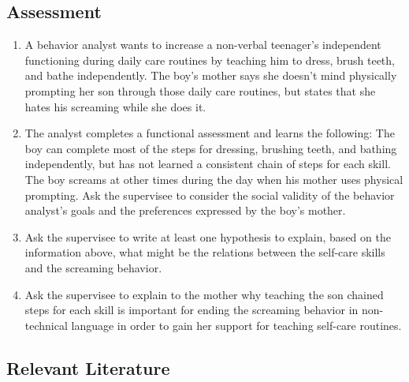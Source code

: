 \subsection{Assessment}
\begin{enumerate}
\item A behavior analyst wants to increase a non-verbal teenager's independent functioning during daily care routines by teaching him to dress, brush teeth, and bathe independently. The boy's mother says she doesn't mind physically prompting her son through those daily care routines, but states that she hates his screaming while she does it.

\item The analyst completes a functional assessment and learns the following: The boy can complete most of the steps for dressing, brushing teeth, and bathing independently, but has not learned a consistent chain of steps for each skill. The boy screams at other times during the day when his mother uses physical prompting. Ask the supervisee to consider the social validity of the behavior analyst's goals and the preferences expressed by the boy's mother. 

\item Ask the supervisee to write at least one hypothesis to explain, based on the information above, what might be the relations between the self-care skills and the screaming behavior.

\item Ask the supervisee to explain to the mother why teaching the son chained steps for each skill is important for ending the screaming behavior in non-technical language in order to gain her support for teaching self-care routines.
\end{enumerate}
%
\subsection{Relevant Literature}
\begin{refsection}
\nocite{test,alang2017police,clayton2018black}
\printbibliography[heading=none]
\end{refsection}
%
